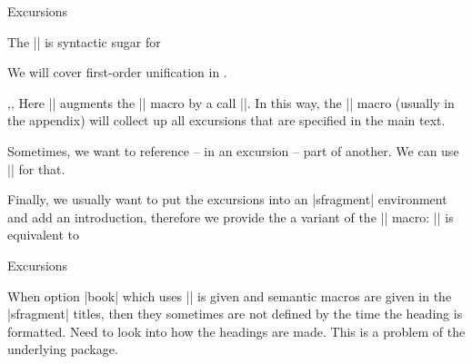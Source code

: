 \begin{sfragment}[id=sec:user:excursions]{Excursions}

\begin{function}{\excursion}
  The || is syntactic sugar for

\begin{latexcode}
\begin{nparagraph}[title=Excursion]
  We will cover first-order unification in .
\end{nparagraph}
\end{latexcode}
\end{function}

\begin{function}{\activateexcursion,\printexcursion,\excursionref}
  Here || augments the |\printexcursions| macro by a call
  ||. In this way, the |\printexcursions| macro (usually in the
  appendix) will collect up all excursions that are specified in the main text.

  Sometimes, we want to reference -- in an excursion -- part of another. We can use
  || for that.
\end{function}

\begin{function}{\excursiongroup}
  Finally, we usually want to put the excursions into an |sfragment| environment and add
  an introduction, therefore we provide the a variant of the |\printexcursions| macro:
  |\excursiongroup[id=|\meta{id}|,intro=|\meta{path}|]| is equivalent to
\begin{latexcode}
\begin{note}
\begin{sfragment}[id=<id>]{Excursions}
  \printexcursions
\end{sfragment}
\end{note}
\end{latexcode}
\end{function}
\end{sfragment}

\begin{dangerbox}
  When option |book| which uses |\pagestyle{headings}| is given and semantic macros are
  given in the |sfragment| titles, then they sometimes are not defined by the time the
  heading is formatted. Need to look into how the headings are made. This is a problem of
  the underlying  package.
\end{dangerbox}

